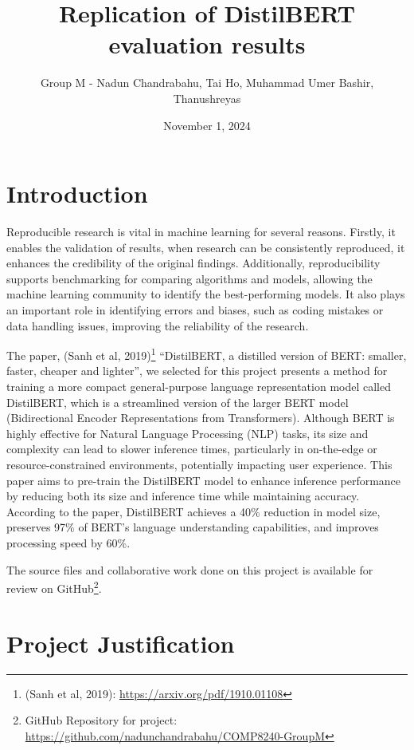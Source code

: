 \documentclass[
  11pt,
]{article}
\title{Replication of DistilBERT evaluation results}
\author{Group M - Nadun Chandrabahu, Tai Ho, Muhammad Umer Bashir,
Thanushreyas}
\date{November 1, 2024}
\begin{document}
\maketitle

\section{Introduction}\label{introduction}

Reproducible research is vital in machine learning for several reasons.
Firstly, it enables the validation of results, when research can be
consistently reproduced, it enhances the credibility of the original
findings. Additionally, reproducibility supports benchmarking for
comparing algorithms and models, allowing the machine learning community
to identify the best-performing models. It also plays an important role
in identifying errors and biases, such as coding mistakes or data
handling issues, improving the reliability of the research.

The paper, (Sanh et al, 2019)\footnote{(Sanh et al, 2019):
  \url{https://arxiv.org/pdf/1910.01108}} ``DistilBERT, a distilled
version of BERT: smaller, faster, cheaper and lighter'', we selected for
this project presents a method for training a more compact
general-purpose language representation model called DistilBERT, which
is a streamlined version of the larger BERT model (Bidirectional Encoder
Representations from Transformers). Although BERT is highly effective
for Natural Language Processing (NLP) tasks, its size and complexity can
lead to slower inference times, particularly in on-the-edge or
resource-constrained environments, potentially impacting user
experience. This paper aims to pre-train the DistilBERT model to enhance
inference performance by reducing both its size and inference time while
maintaining accuracy. According to the paper, DistilBERT achieves a 40\%
reduction in model size, preserves 97\% of BERT's language understanding
capabilities, and improves processing speed by 60\%.

The source files and collaborative work done on this project is
available for review on GitHub\footnote{GitHub Repository for project:
  \url{https://github.com/nadunchandrabahu/COMP8240-GroupM}}.

\section{Project Justification}\label{project-justification}
\end{document}
